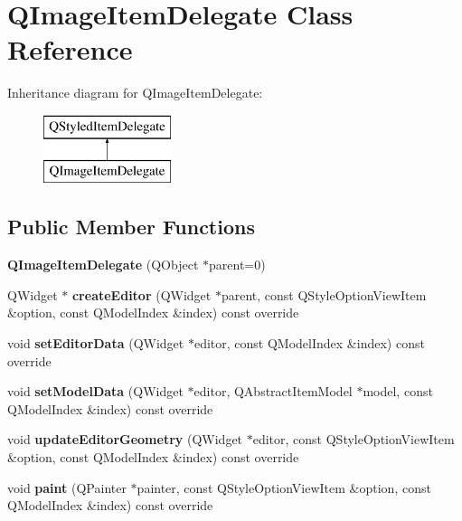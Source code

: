 \hypertarget{class_q_image_item_delegate}{}\section{Q\+Image\+Item\+Delegate Class Reference}
\label{class_q_image_item_delegate}
Inheritance diagram for Q\+Image\+Item\+Delegate\+:\begin{figure}[H]
\begin{center}
\leavevmode
\includegraphics[height=2.000000cm]{class_q_image_item_delegate}
\end{center}
\end{figure}
\subsection*{Public Member Functions}
\begin{DoxyCompactItemize}
\item 
\mbox{\label{class_q_image_item_delegate_a8c691fff46e302ec5b994268d38b8186}} 
{\bfseries Q\+Image\+Item\+Delegate} (Q\+Object $\ast$parent=0)
\item 
\mbox{\label{class_q_image_item_delegate_aaf81d2e56521fc58dee01cd36cc5f305}} 
Q\+Widget $\ast$ {\bfseries create\+Editor} (Q\+Widget $\ast$parent, const Q\+Style\+Option\+View\+Item \&option, const Q\+Model\+Index \&index) const override
\item 
\mbox{\label{class_q_image_item_delegate_a7bdd9939763a64ec4c8cee07ec978d31}} 
void {\bfseries set\+Editor\+Data} (Q\+Widget $\ast$editor, const Q\+Model\+Index \&index) const override
\item 
\mbox{\label{class_q_image_item_delegate_ac3fa7afe57e2748b6c670d33fa784abf}} 
void {\bfseries set\+Model\+Data} (Q\+Widget $\ast$editor, Q\+Abstract\+Item\+Model $\ast$model, const Q\+Model\+Index \&index) const override
\item 
\mbox{\label{class_q_image_item_delegate_ac2174be48aa2f16189dd8d5178547c79}} 
void {\bfseries update\+Editor\+Geometry} (Q\+Widget $\ast$editor, const Q\+Style\+Option\+View\+Item \&option, const Q\+Model\+Index \&index) const override
\item 
\mbox{\label{class_q_image_item_delegate_a560c6de006eff503497a75834a2838f1}} 
void {\bfseries paint} (Q\+Painter $\ast$painter, const Q\+Style\+Option\+View\+Item \&option, const Q\+Model\+Index \&index) const override
\end{DoxyCompactItemize}


